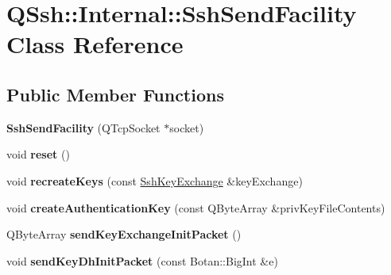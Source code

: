 \hypertarget{class_q_ssh_1_1_internal_1_1_ssh_send_facility}{}\section{Q\+Ssh\+:\+:Internal\+:\+:Ssh\+Send\+Facility Class Reference}
\label{class_q_ssh_1_1_internal_1_1_ssh_send_facility}
\subsection*{Public Member Functions}
\begin{DoxyCompactItemize}
\item 
\mbox{\label{class_q_ssh_1_1_internal_1_1_ssh_send_facility_ae957d120345e26c153298296421536b9}} 
{\bfseries Ssh\+Send\+Facility} (Q\+Tcp\+Socket $\ast$socket)
\item 
\mbox{\label{class_q_ssh_1_1_internal_1_1_ssh_send_facility_aa82b09cf47247577f489658c2360ecb7}} 
void {\bfseries reset} ()
\item 
\mbox{\label{class_q_ssh_1_1_internal_1_1_ssh_send_facility_a20bddd18afaef477e70ae546197da885}} 
void {\bfseries recreate\+Keys} (const \mbox{\hyperlink{class_q_ssh_1_1_internal_1_1_ssh_key_exchange}{Ssh\+Key\+Exchange}} \&key\+Exchange)
\item 
\mbox{\label{class_q_ssh_1_1_internal_1_1_ssh_send_facility_af3f88d2bed2d6c44abf8586a37a9a39b}} 
void {\bfseries create\+Authentication\+Key} (const Q\+Byte\+Array \&priv\+Key\+File\+Contents)
\item 
\mbox{\label{class_q_ssh_1_1_internal_1_1_ssh_send_facility_a682e4b0a9240d9b81cb10e94b5d5a389}} 
Q\+Byte\+Array {\bfseries send\+Key\+Exchange\+Init\+Packet} ()
\item 
\mbox{\label{class_q_ssh_1_1_internal_1_1_ssh_send_facility_a08b44d5b0936ff3147b233ff4aa11e84}} 
void {\bfseries send\+Key\+Dh\+Init\+Packet} (const Botan\+::\+Big\+Int \&e)

\end{DoxyCompactItemize}

